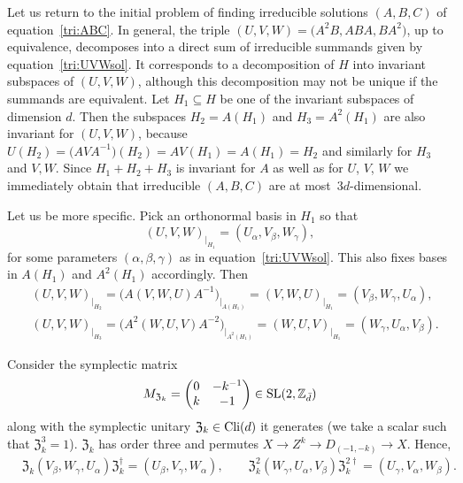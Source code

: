 \documentclass[pdftex]{sigma}
\numberwithin{equation}{section}
\newcommand{\ea}[1]{\begin{align}#1\end{align}}
\newcommand{\nn}{\nonumber \\}
\newcommand{\mbb}{\mathbb}
\newcommand{\bmp}{\begin{pmatrix}}
\newcommand{\emp}{\end{pmatrix}}
\begin{document}
Let us return to the initial problem of finding irreducible solutions $(A,B,C)$ of equation~\eqref{tri:ABC}.
In general, the triple $(U,V,W) = \bigl(A^2B, ABA, BA^2\bigr)$, up to equivalence,
decomposes into a direct sum of irreducible summands given by equation~\eqref{tri:UVWsol}.
It corresponds to a decomposition of $H$ into invariant subspaces of $(U,V,W)$,
although this decomposition may not be unique if the summands are equivalent.
Let $H_1 \subseteq H$ be one of the invariant subspaces of dimension $d$.
Then the subspaces $H_2=A(H_1)$ and $H_3=A^2(H_1)$ are also invariant for $(U,V,W)$,
because $U(H_2) = \bigl(AVA^{-1}\bigr)(H_2) = AV(H_1) = A(H_1) = H_2$ and similarly for $H_3$ and $V, W$.
Since $H_1 + H_2 + H_3$ is invariant for $A$ as well as for $U$, $V$, $W$ we immediately obtain
that irreducible $(A,B,C)$ are at most~$3d$-dimensional.

Let us be more specific. Pick an orthonormal basis in $H_1$ so that
\[
 (U,V,W)_{|_{H_1}} = (U_{\alpha},V_{\beta},W_{\gamma}),
\]
for some parameters $(\alpha, \beta, \gamma)$ as in equation~\eqref{tri:UVWsol}.
This also fixes bases in $A(H_1)$ and $A^2(H_1)$ accordingly.
Then
\begin{align*}
 & (U,V,W)_{|_{H_2}} = \bigl(A(V,W,U)A^{-1}\bigr)_{|_{A(H_1)}}
 = (V,W,U)_{|_{H_1}} = (V_{\beta},W_{\gamma},U_{\alpha}), \nn
 & (U,V,W)_{|_{H_3}} = \bigl(A^2(W,U,V)A^{-2}\bigr)_{|_{A^2(H_1)}}
 = (W,U,V)_{|_{H_1}} = (W_{\gamma},U_{\alpha}, V_{\beta}).
\end{align*}

Consider the symplectic matrix
\[
M_{\mathfrak{Z}_k} = \bmp 0 & -k^{-1} \\ k & -1 \emp \in {\rm SL}(2, \mbb{Z}_{\bar{d}} )
\]
along with the symplectic unitary $\mathfrak{Z}_k \in {\rm Cli}(d)$ it generates
(we take a scalar such that $\mathfrak{Z}_k^3=1$).
$\mathfrak{Z}_k$ has order three and permutes $X \rightarrow Z^k \rightarrow D_{(-1,-k)} \rightarrow X$.
Hence,
\begin{align*}
 & \mathfrak{Z}_k(V_{\beta},W_{\gamma},U_{\alpha})\mathfrak{Z}_k^\dag
 = (U_{\beta},V_{\gamma},W_{\alpha}),
 \qquad \mathfrak{Z}_k^2(W_{\gamma},U_{\alpha},V_{\beta})\mathfrak{Z}_k^{2\dag}
 = (U_{\gamma},V_{\alpha},W_{\beta}).
\end{align*}
\end{document}
